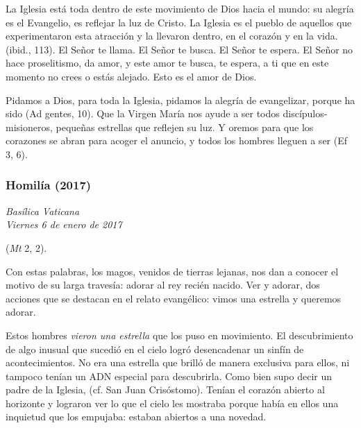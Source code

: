 \begin{body}
\begin{body}
{La Iglesia está toda dentro de este movimiento de Dios hacia el mundo: su alegría es el Evangelio, es reflejar la luz de Cristo. La Iglesia es el pueblo de aquellos que experimentaron esta atracción y la llevaron dentro, en el corazón y en la vida.  (ibid., 113). El Señor te llama. El Señor te busca. El Señor te espera. El Señor no hace proselitismo, da amor, y este amor te busca, te espera, a ti que en este momento no crees o estás alejado. Esto es el amor de Dios.

Pidamos a Dios, para toda la Iglesia, pidamos la alegría de evangelizar, porque ha sido  (Ad gentes, 10). Que la Virgen María nos ayude a ser todos discípulos-misioneros, pequeñas estrellas que reflejen su luz. Y oremos para que los corazones se abran para acoger el anuncio, y todos los hombres lleguen a ser  (Ef 3, 6).

\subsubsection{Homilía (2017)}

\emph{Basílica Vaticana\\ Viernes 6 de enero de 2017}


 (\emph{Mt} 2, 2).

Con estas palabras, los magos, venidos de tierras lejanas, nos dan a conocer el motivo de su larga travesía: adorar al rey recién nacido. Ver y adorar, dos acciones que se destacan en el relato evangélico: vimos una estrella y queremos adorar.

Estos hombres \emph{vieron una estrella} que los puso en movimiento. El descubrimiento de algo inusual que sucedió en el cielo logró desencadenar un sinfín de acontecimientos. No era una estrella que brilló de manera exclusiva para ellos, ni tampoco tenían un ADN especial para descubrirla. Como bien supo decir un padre de la Iglesia,  (cf. San Juan Crisóstomo). Tenían el corazón abierto al horizonte y lograron ver lo que el cielo les mostraba porque había en ellos una inquietud que los empujaba: estaban abiertos a una novedad.

}
\end{body}
\end{body}

